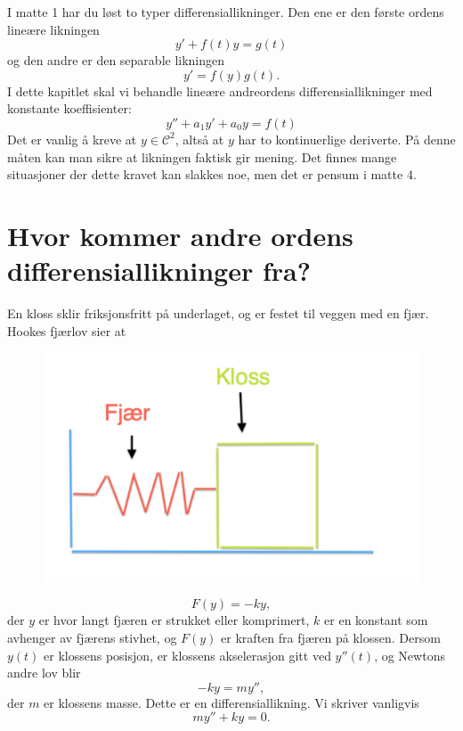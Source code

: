 

\label{ch:andre-ordens-lineare-differensiallikninger}


I matte 1 har du løst to typer differensiallikninger. Den ene er den første ordens lineære likningen
\[
y'+f(t)y=g(t)
\]
og den andre er den separable likningen
\[
y'=f(y)g(t).
\]
I dette kapitlet skal vi behandle lineære andreordens differensiallikninger med konstante koeffisienter:
\[
y''+a_1y'+a_0y=f(t)
\]
Det er vanlig å kreve at $y \in \mathcal C^2$, altså at $y$ har to kontinuerlige deriverte. 
På denne måten kan man sikre at likningen faktisk gir mening. 
Det finnes mange situasjoner der dette kravet kan slakkes noe, 
men det er pensum i matte 4.  







\section*{Hvor kommer andre ordens differensiallikninger fra?}
En kloss sklir friksjonsfritt p{\aa} underlaget, og er festet til veggen med en fj{\ae}r. Hookes fj{\ae}rlov sier at 
\begin{figure}[htbp]
  \begin{center}
	\includegraphics[scale=.35]{Hooke.pdf}
	\label{fig:Num1}
	\end{center}
\end{figure}
\[
F(y)=-ky,
\]
der $y$ er hvor langt fj{\ae}ren er strukket eller komprimert, 
$k$ er en konstant som avhenger av fj{\ae}rens stivhet, 
og $F(y)$ er kraften fra fj{\ae}ren p{\aa} klossen. 
Dersom $y(t)$ er klossens posisjon, er klossens akselerasjon gitt ved $y''(t)$,
og Newtons andre lov blir
\begin{equation*}
-ky=my'',
\end{equation*}
der $m$ er klossens masse. Dette er en differensiallikning. Vi skriver vanligvis
\[
my''+ky=0.
\]


